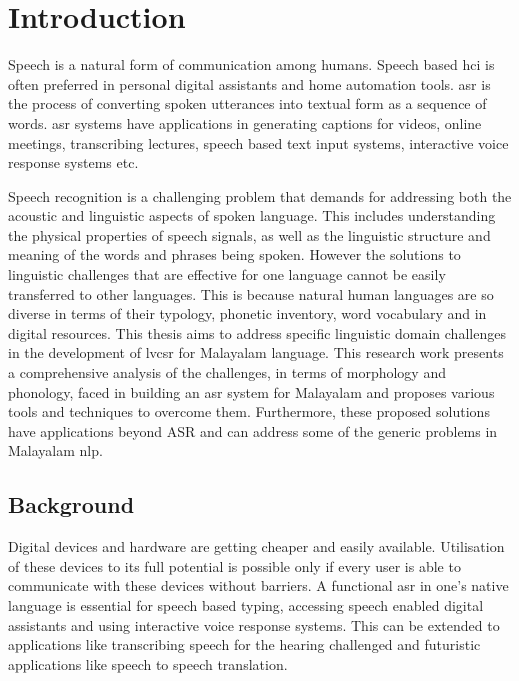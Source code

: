 \chapter{Introduction}
\label{Ch:Introduction} %
\graphicspath{{Figures/chapter1-Intro/}}

\thispagestyle{empty} %

Speech is a natural form of communication among humans. Speech based \gls{hci}
is often preferred in personal digital assistants and home automation tools.
\Gls{asr} is the process of converting spoken utterances into textual form as a
sequence of words. \Gls{asr} systems have applications in generating captions
for videos, online meetings, transcribing lectures, speech based text input
systems, interactive voice response systems etc.

Speech recognition is a challenging problem that demands for addressing both the
acoustic and linguistic aspects of spoken language. This includes understanding
the physical properties of speech signals, as well as the linguistic structure
and meaning of the words and phrases being spoken. However the solutions to
linguistic challenges that are effective for one language cannot be easily
transferred to other languages. This is because natural human languages are so
diverse in terms of their typology, phonetic inventory, word vocabulary and in
digital resources. This thesis aims to address specific linguistic domain
challenges in the development of \gls{lvcsr} for Malayalam language. This
research work presents a comprehensive analysis of the challenges, in terms of
morphology and phonology, faced in building an \gls{asr} system for Malayalam
and proposes various tools and techniques to overcome them. Furthermore, these
proposed solutions have applications beyond ASR and can address some of the
generic problems in Malayalam \gls{nlp}.

\section{Background}

Digital devices and hardware are getting cheaper and easily available.
Utilisation of these devices to its full potential is possible only if every
user is able to communicate with these devices without barriers. A functional
\gls{asr} in one's native language is essential for speech based typing,
accessing speech enabled digital assistants and using interactive voice response
systems. This can be extended to applications like transcribing speech for the
hearing challenged and futuristic applications like speech to speech
translation.

